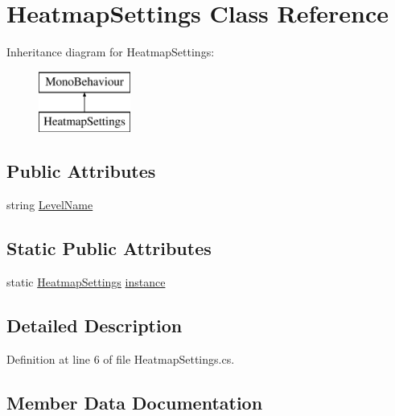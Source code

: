\hypertarget{class_heatmap_settings}{}\section{Heatmap\+Settings Class Reference}
\label{class_heatmap_settings}
Inheritance diagram for Heatmap\+Settings\+:\begin{figure}[H]
\begin{center}
\leavevmode
\includegraphics[height=2.000000cm]{class_heatmap_settings}
\end{center}
\end{figure}
\subsection*{Public Attributes}
\begin{DoxyCompactItemize}
\item 
string \mbox{\hyperlink{class_heatmap_settings_a337123e4b7b337e09c10a4bece5a5578}{Level\+Name}}
\end{DoxyCompactItemize}
\subsection*{Static Public Attributes}
\begin{DoxyCompactItemize}
\item 
static \mbox{\hyperlink{class_heatmap_settings}{Heatmap\+Settings}} \mbox{\hyperlink{class_heatmap_settings_aa6c2c0ee2e69e343e4317033ce5cb9e1}{instance}}
\end{DoxyCompactItemize}


\subsection{Detailed Description}


Definition at line 6 of file Heatmap\+Settings.\+cs.



\subsection{Member Data Documentation}
\mbox{\label{class_heatmap_settings_aa6c2c0ee2e69e343e4317033ce5cb9e1}} 
